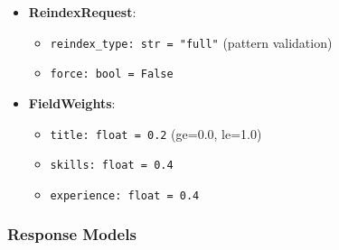 \begin{itemize}
    \item \textbf{ReindexRequest}:
    \begin{itemize}
        \item \texttt{reindex\_type: str = "full"} (pattern validation)
        \item \texttt{force: bool = False}
    \end{itemize}
    
    \item \textbf{FieldWeights}:
    \begin{itemize}
        \item \texttt{title: float = 0.2} (ge=0.0, le=1.0)
        \item \texttt{skills: float = 0.4}
        \item \texttt{experience: float = 0.4}
    \end{itemize}
\end{itemize}

\subsubsection{Response Models}

